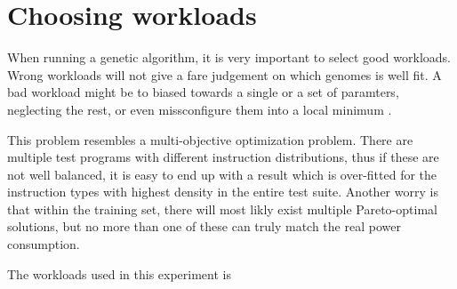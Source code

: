\section{Choosing workloads}
When running a genetic algorithm, it is very important to select good workloads.
Wrong workloads will not give a fare judgement on which genomes is well fit. A
bad workload might be to biased towards a single or a set of paramters,
neglecting the rest, or even missconfigure them into a local minimum \cite{magic-book-of-ga}.

This problem resembles a multi-objective optimization problem. There are multiple test programs with different
instruction distributions, thus if these are not well balanced, it is easy to end up with a result which is over-fitted
for the instruction types with highest density in the entire test suite. Another worry is that within the training set,
there will most likly exist multiple Pareto-optimal solutions\cite{deb2014multi}, but no more than one of these can
truly match the real power consumption.

The workloads used in this experiment is
